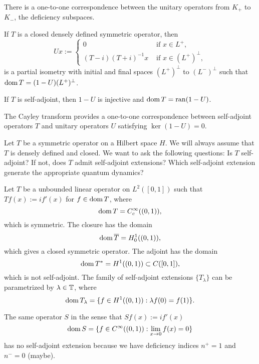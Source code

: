 \documentclass{../../large}
\begin{document}
\begin{prb}
There is a one-to-one correspondence between the unitary operators from $K_+$ to $K_-$, the deficiency subspaces.

If $T$ is a closed densely defined symmetric operator, then
\[Ux:=\begin{cases}0&\text{ if }x\in L^+,\\(T-i)(T+i)^{-1}x&\text{ if }x\in(L^+)^\perp,\end{cases}\]
is a partial isometry with initial and final spaces $(L^+)^\perp$ to $(L^-)^\perp$ such that $\operatorname{dom} T=(1-U)(L^+)^\perp$.
\begin{parts}
\item If $T$ is self-adjoint, then $1-U$ is injective and $\operatorname{dom} T=\operatorname{ran}(1-U)$.
\item The Cayley transform provides a one-to-one correspondence between self-adjoint operators $T$ and unitary operators $U$ satisfying $\ker(1-U)=0$.
\item
\end{parts}
\end{prb}


Let $T$ be a symmetric operator on a Hilbert space $H$.
We will always assume that $T$ is densely defined and closed.
We want to ask the following questions:
Is $T$ self-adjoint?
If not, does $T$ admit self-adjoint extensions?
Which self-adjoint extension generate the appropriate quantum dynamics?

\begin{ex*}
Let $T$ be a unbounded linear operator on $L^2([0,1])$ such that $Tf(x):=if'(x)$ for $f\in\operatorname{dom} T$, where
\[\operatorname{dom} T=C_c^\infty((0,1)),\]
which is symmetric.
The closure has the domain
\[\operatorname{dom}\overline T=H_0^1((0,1)),\]
which gives a closed symmetric operator.
The adjoint has the domain
\[\operatorname{dom} T^*=H^1((0,1))\subset C([0,1]),\]
which is not self-adjoint.
The family of self-adjoint extensions $\{T_\lambda\}$ can be parametrized by $\lambda\in\mathbb{T}$, where
\[\operatorname{dom} T_\lambda=\{f\in H^1((0,1)):\lambda f(0)=f(1)\}.\]



The same operator $S$ in the sense that $Sf(x):=if'(x)$
\[\operatorname{dom} S=\{f\in C^\infty((0,1)):\lim_{x\to0}f(x)=0\}\]
has no self-adjoint extension because we have deficiency indices $n^+=1$ and $n^-=0$ (maybe).
\end{ex*}
\end{document}
